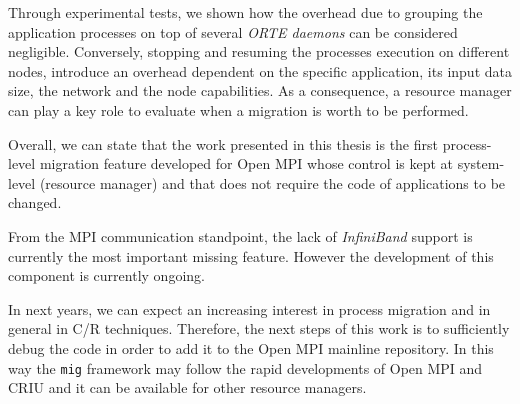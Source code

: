 Through experimental tests, we shown how the overhead due to grouping the
application processes on top of several \emph{ORTE daemons} can be considered
negligible.
Conversely, stopping and resuming the processes execution on different nodes,
introduce an overhead dependent on the specific application, its input data
size, the network and the node capabilities.
As a consequence, a resource manager can play a key role to evaluate when a
migration is worth to be performed.

Overall, we can state that the work presented in this thesis is the first
process-level migration feature developed for Open MPI whose control is kept at
system-level (resource manager) and that does not require the code of
applications to be changed.

From the MPI communication standpoint, the lack of \emph{InfiniBand} support is
currently the most important missing feature. However the development of this
component is currently ongoing.

In next years, we can expect an increasing interest in process migration
and in general in C/R techniques. Therefore, the next steps of this work is to
sufficiently debug the code in order to add it to the Open MPI mainline
repository. In this way the \texttt{mig} framework may follow the rapid
developments of Open MPI and CRIU and it can be available for other resource
managers.
